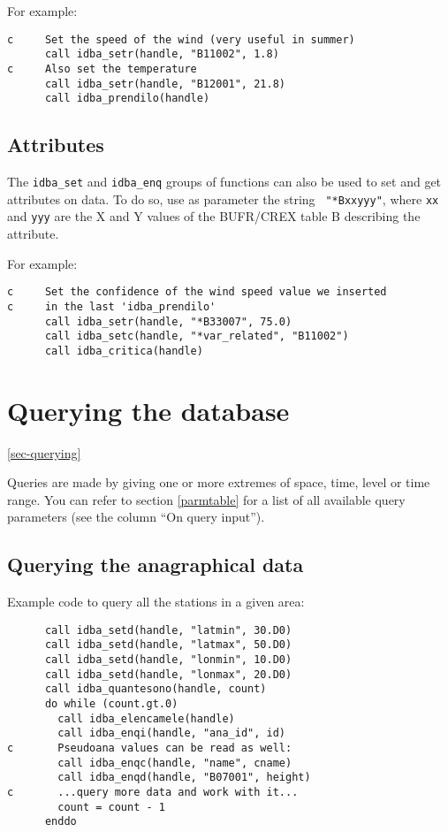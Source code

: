 \documentclass[final,12pt,a4paper,twoside]{book}
\begin{document}
For example:

\begin{verbatim}
c     Set the speed of the wind (very useful in summer)
      call idba_setr(handle, "B11002", 1.8)
c     Also set the temperature
      call idba_setr(handle, "B12001", 21.8)
      call idba_prendilo(handle)
\end{verbatim}


\subsection{Attributes}

\label{sec-attrs}

The {\tt idba\_set} and {\tt idba\_enq} groups of functions can also be used to
set and get attributes on data.  To do so, use as parameter the string {\tt
"*Bxxyyy"}, where {\tt xx} and {\tt yyy} are the X and Y values of the
BUFR/CREX table B describing the attribute.

For example:

\begin{verbatim}
c     Set the confidence of the wind speed value we inserted
c     in the last 'idba_prendilo'
      call idba_setr(handle, "*B33007", 75.0)
      call idba_setc(handle, "*var_related", "B11002")
      call idba_critica(handle)
\end{verbatim}

\section {Querying the database}

\ref{sec-querying}

Queries are made by giving one or more extremes of space, time, level or time
range.  You can refer to section \ref{parmtable} for a list of all available
query parameters (see the column ``On query input'').

\subsection {Querying the anagraphical data}

Example code to query all the stations in a given area:
\label{fun-idba_quantesono}
\label{fun-idba_elencamele}

\begin{verbatim}
      call idba_setd(handle, "latmin", 30.D0)
      call idba_setd(handle, "latmax", 50.D0)
      call idba_setd(handle, "lonmin", 10.D0)
      call idba_setd(handle, "lonmax", 20.D0)
      call idba_quantesono(handle, count)
      do while (count.gt.0)
        call idba_elencamele(handle)
        call idba_enqi(handle, "ana_id", id)
c       Pseudoana values can be read as well:
        call idba_enqc(handle, "name", cname)
        call idba_enqd(handle, "B07001", height)
c       ...query more data and work with it...
        count = count - 1
      enddo
\end{verbatim}
\end{document}
